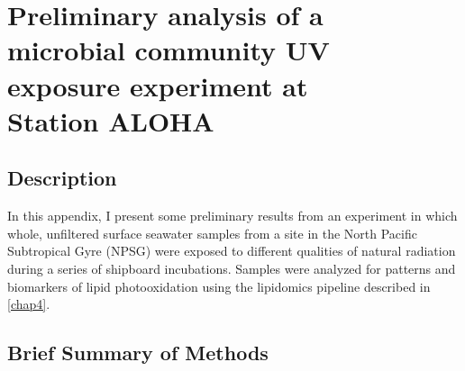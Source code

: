 
\begingroup%
\makeatletter%
\cleardoublepage%
\let\newpage\relax%
\let\clearpage\relax%
\vspace*{\fill}%
\vspace*{\dimexpr-50\p@-\baselineskip}%
\chapter[Preliminary analysis of a microbial community UV exposure experiment at Station ALOHA]{Preliminary analysis of a\\microbial community UV\\exposure experiment at\\Station ALOHA}
\label{AppB}
\vspace*{\fill}%
\endgroup%

\clearpage

\section{Description}

In this appendix, I present some preliminary results from an experiment in which whole, unfiltered surface seawater samples from a site in the North Pacific Subtropical Gyre (NPSG) were exposed to different qualities of natural radiation during a series of shipboard incubations. Samples were analyzed for patterns and biomarkers of lipid photooxidation using the lipidomics pipeline described in \autoref{chap4}.

\section{Brief Summary of Methods}

